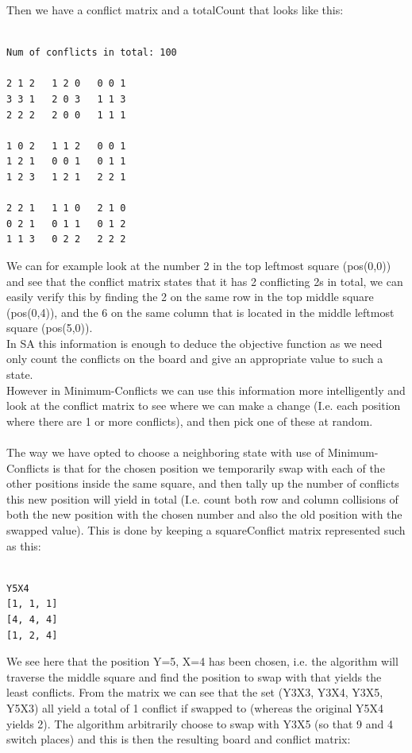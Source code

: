 \documentclass[12pt, a4paper]{article}
\begin{document}
\noindent
Then we have a conflict matrix and a totalCount that looks like this:

\begin{verbatim}

Num of conflicts in total: 100

2 1 2 	1 2 0 	0 0 1 
3 3 1 	2 0 3 	1 1 3 
2 2 2 	2 0 0 	1 1 1 

1 0 2 	1 1 2 	0 0 1 
1 2 1 	0 0 1 	0 1 1 
1 2 3 	1 2 1 	2 2 1 

2 2 1 	1 1 0 	2 1 0 
0 2 1 	0 1 1 	0 1 2 
1 1 3 	0 2 2 	2 2 2 

\end{verbatim}
\noindent
We can for example look at the number 2 in the top leftmost square (pos(0,0)) and see that the conflict matrix states that it has 2 conflicting 2s in total, we can easily verify this by finding the 2 on the same row in the top middle square (pos(0,4)), and the 6 on the same column that is located in the middle leftmost
square (pos(5,0)).
\\
In SA this information is enough to deduce the objective function as we need only count the conflicts on the board and give an appropriate value to such a state. \\
However in Minimum-Conflicts we can use this information more intelligently and look at the conflict matrix to see where we can make a change (I.e. each position where there are 1 or more conflicts), and then pick one of these at random.
\\\\
The way we have opted to choose a neighboring state with use of Minimum-Conflicts is that for the chosen position we temporarily swap with each of the other positions inside the same square, and then tally up the number of conflicts this new position will yield in total (I.e. count both row and column collisions of both the new position with the chosen number and also the old position with the swapped value). This is done by keeping a squareConflict matrix represented such as this:

\begin{verbatim}

Y5X4
[1, 1, 1]
[4, 4, 4]
[1, 2, 4]

\end{verbatim}
\noindent
We see here that the position Y=5, X=4 has been chosen, i.e. the algorithm will traverse the middle square and find the position to swap with that yields the least conflicts.
From the matrix we can see that the set (Y3X3, Y3X4, Y3X5, Y5X3) all yield a total of 1 conflict if swapped to (whereas the original Y5X4 yields 2). The algorithm arbitrarily choose to swap with Y3X5 (so that 9 and 4 switch places) and this is then the resulting board and conflict matrix:
\end{document}

